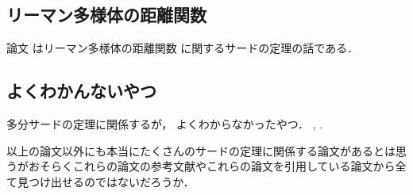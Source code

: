 \documentclass[leqno, a4paper, 12pt]{jsarticle}
\begin{document}
\subsection{リーマン多様体の距離関数}
論文
\cite{MR2128549}
はリーマン多様体の距離関数
に関するサードの定理の話である．

\subsection{よくわかんないやつ}
多分サードの定理に関係するが，
よくわからなかったやつ．
\cite{MR0154296}, 
\cite{MR2355374}. 


以上の論文以外にも本当にたくさんのサードの定理に関係する論文があるとは思うがおそらくこれらの論文の参考文献やこれらの論文を引用している論文から全て見つけ出せるのではないだろうか．

\nocite{*}


\end{document}
